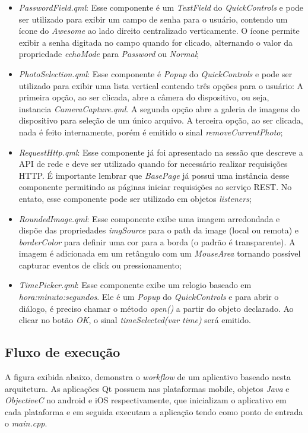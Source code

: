 \begin{itemize}
	\item \textit{PasswordField.qml}: Esse componente é um \textit{TextField} do \textit{QuickControls} e pode ser utilizado para exibir um campo de senha para o usuário, contendo um ícone do \textit{Awesome} ao lado direito centralizado verticamente. O ícone permite exibir a senha digitada no campo quando for clicado, alternando o valor da propriedade \textit{echoMode} para \textit{Password} ou \textit{Normal};

	\item \textit{PhotoSelection.qml}: Esse componente é \textit{Popup} do \textit{QuickControls} e pode ser utilizado para exibir uma lista vertical contendo três opções para o usuário: A primeira opção, ao ser clicada, abre a câmera do dispositivo, ou seja, instancia \textit{CameraCapture.qml}. A segunda opção abre a galeria de imagens do dispositivo para seleção de um único arquivo. A terceira opção, ao ser clicada, nada é feito internamente, porém é emitido o sinal \textit{removeCurrentPhoto};

	\item \textit{RequestHttp.qml}: Esse componente já foi apresentado na sessão que descreve a API de rede e deve ser utilizado quando for necessário realizar requisições HTTP. É importante lembrar que \textit{BasePage} já possui uma instância desse componente permitindo as páginas iniciar requisições ao serviço REST. No entato, esse componente pode ser utilizado em objetos \textit{listeners};

	\item \textit{RoundedImage.qml}: Esse componente exibe uma imagem arredondada e dispõe das propriedades \textit{imgSource} para o path da image (local ou remota) e \textit{borderColor} para definir uma cor para a borda (o padrão é transparente). A imagem é adicionada em um retângulo com um \textit{MouseArea} tornando possível capturar eventos de click ou pressionamento;

	\item \textit{TimePicker.qml}: Esse componente exibe um relogio baseado em \textit{hora:minuto:segundos}. Ele é um \textit{Popup} do \textit{QuickControls} e para abrir o diálogo, é preciso chamar o método \textit{open()} a partir do objeto declarado. Ao clicar no botão \textit{OK}, o sinal \textit{timeSelected(var time)} será emitido.
\end{itemize}


\subsection{Fluxo de execução}\label{sec:solucao-desenvolvida}
A figura exibida abaixo, demonstra o \textit{workflow} de um aplicativo baseado nesta arquitetura. As aplicações Qt possuem nas plataformas mobile, objetos \textit{Java} e \textit{ObjectiveC} no android e iOS respectivamente, que inicializam o aplicativo em cada plataforma e em seguida executam a aplicação tendo como ponto de entrada o \textit{main.cpp}.\par

